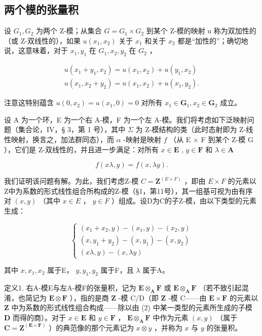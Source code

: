 \subsection{两个模的张量积}

设 \(G_{1}, G_{2}\) 为两个 Z-模；从集合 \(G = G_{1} \times G_{2}\) 到某个 Z-模的映射 u 称为双加性的（或 Z-双线性的），如果 \(u(x_{1}, x_{2})\) 关于 \(x_{1}\) 和关于 \(x_{2}\) 都是“加性的”；确切地说，这意味着，对于 \(x_{1}, y_{1}\) 在 \(G_{1}, x_{2}, y_{2}\) 在 \(G_{2}\) ，

\[
\begin{array}{l} u (x _ {1} + y _ {1}, x _ {2}) = u (x _ {1}, x _ {2}) + u (y _ {1}, x _ {2}) \\ u (x _ {1}, x _ {2} + y _ {2}) = u (x _ {1}, x _ {2}) + u (x _ {1}, y _ {2}). \end{array}
\]

注意这特别蕴含 \(u(0, x_2) = u(x_1, 0) = 0\) 对所有 \(x_1 \in \mathbf{G}_1, x_2 \in \mathbf{G}_2\) 成立。

设 A 为一个环，E 为一个右 A-模，F 为一个左 A-模。我们将考虑如下泛映射问题（集合论，IV，§ 3，第 1 号），其中 \(\Sigma\) 为 Z-模结构的类（此时态射即为 Z-线性映射，换言之，加法群同态），而 \(\alpha\) -映射是映射 \(f\) （从 E \(\times\) F 到某个 Z-模 G ），它们是 Z-双线性的，并且进一步满足：对所有 \(x \in \mathbf{E}\) , \(y \in \mathbf{F}\) 和 \(\lambda \in \mathbf{A}\)

\[
f (x \lambda , y) = f (x, \lambda y).\tag{1}
\]

我们证明该问题有解。为此，我们考虑Z-模 \(C = \mathbf{Z}^{(E \times F)}\) ，即由 \(E \times F\) 的元素以Z中为系数的形式线性组合所构成的Z-模（§1，第11号），其一组基可视为由有序对 \((x, y)\) （其中 \(x \in E\) ， \(y \in F\) ）组成。设D为C的子Z-模，由以下类型的元素生成：

\[
\left\{ \begin{array}{l} (x _ {1} + x _ {2}, y) - (x _ {1}, y) - (x _ {2}, y) \\ (x, y _ {1} + y _ {2}) - (x, y _ {1}) - (x, y _ {2}) \\ (x \lambda , y) - (x, \lambda y) \end{array} \right.\tag{2}
\]

其中 \(x, x_{1}, x_{2}\) 属于E， \(y, y_{1}, y_{2}\) 属于F，且 \(\lambda\) 属于A。

定义1. 右A-模E与左A-模F的张量积，记为 \(\mathbf{E} \otimes_{\mathbf{A}} \mathbf{F}\) 或 \(\mathbf{E} \otimes_{\mathbf{A}} \mathbf{F}\) （若不致引起混淆，也简记为 \(\mathbf{E} \otimes \mathbf{F}\) ），指的是商 \(\mathbf{Z}\) -模 C/D（即 \(\mathbf{Z}\) -模 C——由 \(\mathbf{E} \times \mathbf{F}\) 的元素以 \(\mathbf{Z}\) 中为系数的形式线性组合构成——除以由 (2) 中某一类型的元素所生成的子模 \(\mathbf{D}\) 而得的商）。对于 \(x \in \mathbf{E}\) 和 \(y \in \mathbf{F}\) ， \(\mathbf{E} \otimes_{\mathbf{A}} \mathbf{F}\) 中作为元素 \((x, y)\) （属于 \(\mathbf{C} = \mathbf{Z}^{(\mathbf{E} \times \mathbf{F})}\) ）的典范像的那个元素记为 \(x \otimes y\) ，并称为 \(x\) 与 \(y\) 的张量积。

